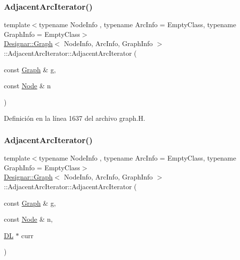 \subsubsection{\texorpdfstring{Adjacent\+Arc\+Iterator()}{AdjacentArcIterator()}\hspace{0.1cm}{\footnotesize\ttfamily [2/5]}}
{\footnotesize\ttfamily template$<$typename Node\+Info , typename Arc\+Info  = Empty\+Class, typename Graph\+Info  = Empty\+Class$>$ \\
\hyperlink{class_designar_1_1_graph}{Designar\+::\+Graph}$<$ Node\+Info, Arc\+Info, Graph\+Info $>$\+::Adjacent\+Arc\+Iterator\+::\+Adjacent\+Arc\+Iterator (\begin{DoxyParamCaption}\item[{const \hyperlink{class_designar_1_1_graph}{Graph} \&}]{g,  }\item[{const \hyperlink{class_designar_1_1_graph_a5dfc7dba9d092ac489c72e40390c37d0}{Node} \&}]{n }\end{DoxyParamCaption})\hspace{0.3cm}{\ttfamily [inline]}}



Definición en la línea 1637 del archivo graph.\+H.

\mbox{\label{class_designar_1_1_graph_1_1_adjacent_arc_iterator_a97e3e5909f6e9b9b6b55cbc0fb2d5263}} 
\subsubsection{\texorpdfstring{Adjacent\+Arc\+Iterator()}{AdjacentArcIterator()}\hspace{0.1cm}{\footnotesize\ttfamily [3/5]}}
{\footnotesize\ttfamily template$<$typename Node\+Info , typename Arc\+Info  = Empty\+Class, typename Graph\+Info  = Empty\+Class$>$ \\
\hyperlink{class_designar_1_1_graph}{Designar\+::\+Graph}$<$ Node\+Info, Arc\+Info, Graph\+Info $>$\+::Adjacent\+Arc\+Iterator\+::\+Adjacent\+Arc\+Iterator (\begin{DoxyParamCaption}\item[{const \hyperlink{class_designar_1_1_graph}{Graph} \&}]{g,  }\item[{const \hyperlink{class_designar_1_1_graph_a5dfc7dba9d092ac489c72e40390c37d0}{Node} \&}]{n,  }\item[{\hyperlink{class_designar_1_1_d_l}{DL} $\ast$}]{curr }\end{DoxyParamCaption})\hspace{0.3cm}{\ttfamily [inline]}}



